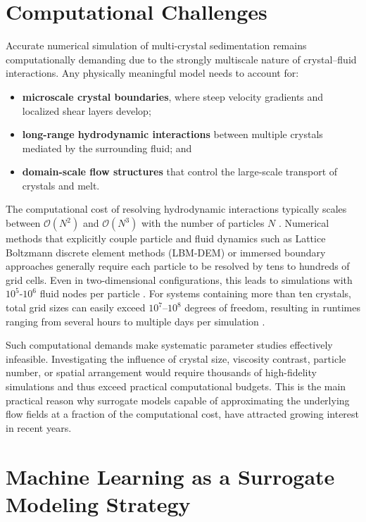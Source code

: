 \section{Computational Challenges}

Accurate numerical simulation of multi-crystal sedimentation remains computationally demanding due to the strongly multiscale nature of crystal--fluid interactions. Any physically meaningful model needs to account for:

\begin{itemize}
    \item \textbf{microscale crystal boundaries}, where steep velocity gradients and localized shear layers develop;
    \item \textbf{long-range hydrodynamic interactions} between multiple crystals mediated by the surrounding fluid; and
    \item \textbf{domain-scale flow structures} that control the large-scale transport of crystals and melt.
\end{itemize}

The computational cost of resolving hydrodynamic interactions typically scales between $\mathcal{O}(N^2)$ and $\mathcal{O}(N^3)$ with the number of particles $N$ \parencite{ladd_numerical_nodate}. Numerical methods that explicitly couple particle and fluid dynamics such as Lattice Boltzmann discrete element methods (LBM-DEM) or immersed boundary approaches generally require each particle to be resolved by tens to hundreds of grid cells. Even in two-dimensional configurations, this leads to simulations with $10^5$-$10^6$ fluid nodes per particle \parencite{Li_IBM-LBM-DEM_2022,leonardi_coupled_2014}. For systems containing more than ten crystals, total grid sizes can easily exceed $10^7$--$10^8$ degrees of freedom, resulting in runtimes ranging from several hours to multiple days per simulation \parencite{Li_IBM-LBM-DEM_2022}.

Such computational demands make systematic parameter studies effectively infeasible. Investigating the influence of crystal size, viscosity contrast, particle number, or spatial arrangement would require thousands of high-fidelity simulations and thus exceed practical computational budgets. This is the main practical reason why surrogate models capable of approximating the underlying flow fields at a fraction of the computational cost, have attracted growing interest in recent years.

\section{Machine Learning as a Surrogate Modeling Strategy}

